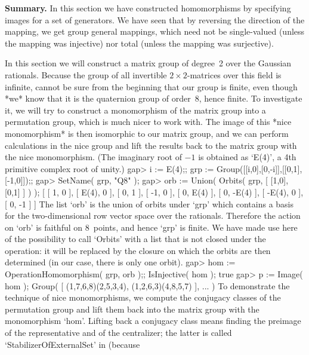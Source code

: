{\bf  Summary.}   In this section   we  have constructed homomorphisms by
specifying images for a set of generators. We have seen that by reversing
the direction of  the mapping, we get  group general mappings, which need
not be single-valued (unless the mapping was injective) nor total (unless
the mapping was surjective).


In this  section we will construct  a matrix group   of degree~2 over the
Gaussian  rationals. Because    the  group of   all  invertible  $2\times
2$-matrices over this  field is infinite, {\GAP}  cannot be sure from the
beginning that our group is finite, even though *we*  know that it is the
quaternion group of order~8, hence finite. To investigate it, we will try
to construct a monomorphism of the matrix group into a permutation group,
which is much nicer to  work with. The  image of this *nice monomorphism*
is then  isomorphic to our matrix group,  and we can perform calculations
in the nice group and lift the results back  to the matrix group with the
nice monomorphism. (The  imaginary root of $-1$  is obtained as `E(4)', a
4th primitive complex root of unity.)
\beginexample
    gap> i := E(4);; grp := Group([[i,0],[0,-i]],[[0,1],[-1,0]]);;
    gap> SetName( grp, "Q8" );
    gap> orb := Union( Orbits( grp, [ [1,0], [0,1] ] ) );
    [ [ 1, 0 ], [ E(4), 0 ], [ 0, 1 ], [ -1, 0 ], [ 0, E(4) ],
        [ 0, -E(4) ], [ -E(4), 0 ], [ 0, -1 ] ]
\endexample
The list `orb' is the union of orbits  under `grp' which contains a basis
for  the two-dimensional row vector  space  over the rationals. Therefore
the action on `orb' is  faithful on 8~points, and  hence `grp' is finite.
We  have made use here  of the possibility to  call  `Orbits' with a list
that is  not closed  under  the operation:  it  will be  replaced by  the
closure  on which the  orbits are then determined  (in our case, there is
only one orbit).
\beginexample
    gap> hom := OperationHomomorphism( grp, orb );; IsInjective( hom );
    true
    gap> p := Image( hom );
    Group( [ (1,7,6,8)(2,5,3,4), (1,2,6,3)(4,8,5,7) ], ... )
\endexample
To  demonstrate the technique  of   nice  monomorphisms, we  compute  the
conjugacy classes of the  permutation group and  lift them back into  the
matrix group with the monomorphism `hom'. Lifting  back a conjugacy class
means finding the preimage of  the representative and of the centralizer;
the latter  is   called  `StabilizerOfExternalSet'   in {\GAP}   (because
